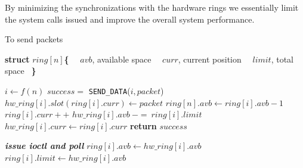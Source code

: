 \documentclass[conference]{IEEEtran}
\begin{document}
By minimizing the synchronizations with the hardware rings we essentially limit the system calls issued and improve the overall system performance. 

\begin{algorithm}
\caption{To send packets}
\label{s_pack}
\begin{algorithmic}[1]

\State \textbf{struct} $ring[ n ]$\textbf{\{}
\State {}
\State {}
\State \  \  $avb$, available space
\State \  \  $curr$, current position
\State \  \  $limit$, total space \ \textbf{\}}

	\State $i \gets f( n ) $ \label{s_pack_param}
	\State $success = $ \texttt{SEND\_DATA}($ i, packet $)
\EndWhile
\EndFunction
{}
	\State $hw\_ring[ i ].slot( ring[ i ].curr ) \gets packet$
	\State $ring[ n ].avb \gets ring[ i ].avb - 1$
	\State $ring[ i ].curr++$
		\State $hw\_ring[ i ].avb \ -=\ ring[ i ].limit$
		\State $hw\_ring[ i ].curr \gets ring[ i ].curr$
	\EndIf
	\State \textbf{return} $success$
\EndIf

\State \textbf{\textit{issue ioctl and poll}}
\State $ring[ i ].avb \gets hw\_ring[ i ].avb$
\State $ring[ i ].limit \gets hw\_ring[ i ].avb$
\EndFunction

\end{algorithmic}
\end{algorithm}
\end{document}
